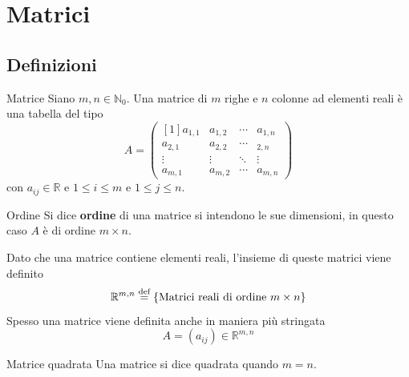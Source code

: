 
\section{Matrici}%
\label{sec:matrici}

\subsection{Definizioni}%
\label{sub:definizioni_e_teoremi}

\begin{Def}{Matrice}
  Siano $m,n\in\mathbb{N}_0$. Una matrice di $m$ righe e $n$ colonne ad elementi reali è
  una tabella del tipo
  \begin{equation*}
    A =
    \begin{pmatrix}[1]
      a_{1,1} & a_{1,2} & \cdots & a_{1,n} \\
      a_{2,1} & a_{2,2} & \cdots & _{2,n} \\
      \vdots  & \vdots  & \ddots & \vdots  \\
      a_{m,1} & a_{m,2} & \cdots & a_{m,n}
    \end{pmatrix}
  \end{equation*}
  con $a_{ij}\in\mathbb{R}$ e $1\leq i\leq m$ e $1\leq j\leq n$.
\end{Def}

\begin{Def}{Ordine}
  Si dice \textbf{ordine} di una matrice si intendono le sue dimensioni, in questo caso
  $A$ è di ordine $m\times n$.
\end{Def}

Dato che una matrice contiene elementi reali, l'insieme di queste matrici viene definito
\begin{equation*}
  \mathbb{R}^{m,n}\overset{\text{def}}{=} \{\text{Matrici reali di ordine }m\times n\}
\end{equation*}
Spesso una matrice viene definita anche in maniera più stringata
\begin{equation*}
  A = (a_{ij})\in\mathbb{R}^{m,n}
\end{equation*}

\begin{Def}{Matrice quadrata}
  Una matrice si dice quadrata quando $m=n$.
\end{Def}

